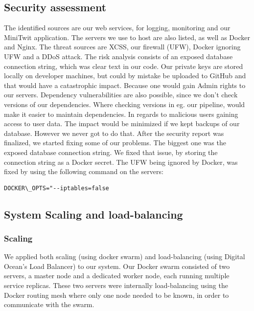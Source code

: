 \subsection{Security assessment}
The identified sources are our web services, for logging, monitoring and our MiniTwit application.
The servers we use to host are also listed, as well as Docker and Nginx.
The threat sources are XCSS, our firewall (UFW), Docker ignoring UFW and a DDoS attack.
The risk analysis consists of an exposed database connection string, which was clear text in our code.
Our private keys are stored locally on developer machines, but could by mistake be uploaded to GitHub and that would have a catastrophic impact. Because one would gain Admin rights to our servers.
Dependency vulnerabilities are also possible, since we don't check versions of our dependencies. Where checking versions in eg. our pipeline, would make it easier to maintain dependencies.
In regards to malicious users gaining access to user data. The impact would be minimized if we kept backups of our database. However we never got to do that.
After the security report was finalized, we started fixing some of our problems. The biggest one was the exposed database connection string. We fixed that issue, by storing the connection string as a Docker secret.
The UFW being ignored by Docker, was fixed by using the following command on the servers: 
\begin{lstlisting}
DOCKER\_OPTS="--iptables=false
\end{lstlisting}

\subsection{System Scaling and load-balancing}
\subsubsection{Scaling}
We applied both scaling (using docker swarm) and load-balancing (using Digital Ocean's Load Balancer) to our system. 
Our Docker swarm consisted of two servers, a master node and a dedicated worker node, each running multiple service replicas. 
These two servers were internally load-balancing using the Docker routing mesh where only one node needed to be known, in order to communicate with the swarm.

